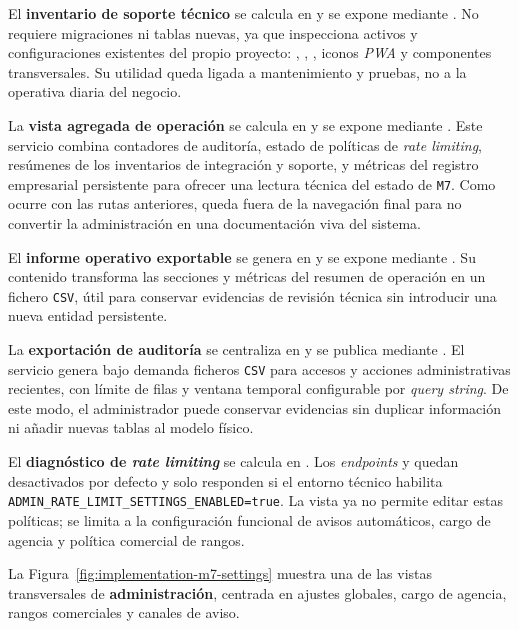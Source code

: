 El \textbf{inventario de soporte técnico} se calcula en  y se expone mediante . No requiere migraciones ni tablas nuevas, ya que inspecciona activos y configuraciones existentes del propio proyecto: , , , iconos \textit{PWA} y componentes transversales. Su utilidad queda ligada a mantenimiento y pruebas, no a la operativa diaria del negocio.

La \textbf{vista agregada de operación} se calcula en  y se expone mediante . Este servicio combina contadores de auditoría, estado de políticas de \textit{rate limiting}, resúmenes de los inventarios de integración y soporte, y métricas del registro empresarial persistente para ofrecer una lectura técnica del estado de \texttt{M7}. Como ocurre con las rutas anteriores, queda fuera de la navegación final para no convertir la administración en una documentación viva del sistema.

El \textbf{informe operativo exportable} se genera en  y se expone mediante . Su contenido transforma las secciones y métricas del resumen de operación en un fichero \texttt{CSV}, útil para conservar evidencias de revisión técnica sin introducir una nueva entidad persistente.

La \textbf{exportación de auditoría} se centraliza en  y se publica mediante . El servicio genera bajo demanda ficheros \texttt{CSV} para accesos y acciones administrativas recientes, con límite de filas y ventana temporal configurable por \textit{query string}. De este modo, el administrador puede conservar evidencias sin duplicar información ni añadir nuevas tablas al modelo físico.

El \textbf{diagnóstico de \textit{rate limiting}} se calcula en . Los \textit{endpoints}  y  quedan desactivados por defecto y solo responden si el entorno técnico habilita \texttt{ADMIN\_RATE\_LIMIT\_SETTINGS\_ENABLED=true}. La vista  ya no permite editar estas políticas; se limita a la configuración funcional de avisos automáticos, cargo de agencia y política comercial de rangos.

La Figura~\ref{fig:implementation-m7-settings} muestra una de las vistas transversales de \textbf{administración}, centrada en ajustes globales, cargo de agencia, rangos comerciales y canales de aviso.

